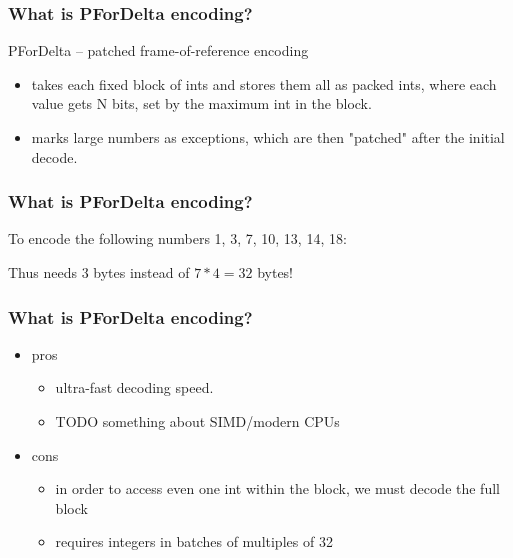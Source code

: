 \documentclass{beamer}
\begin{document}
  	\begin{frame}
  		\frametitle{What is PForDelta encoding?}
  		PForDelta -- patched frame-of-reference encoding
  		\begin{itemize}
  			\item takes each fixed block of ints and stores them all as packed ints, where each value gets N bits, set by the maximum int in the block.
  			\item marks large numbers as exceptions, which are then "patched" after the initial decode.	
  		\end{itemize}
  	\end{frame}
  	\begin{frame}
  		\frametitle{What is PForDelta encoding?}
  		To encode the following numbers 1, 3, 7, 10, 13, 14, 18:
		\vskip15pt 
		\vskip15pt 	
		\pause
		Thus needs 3 bytes instead of $7*4=32$ bytes!
  	\end{frame}
  	\begin{frame}
  		\frametitle{What is PForDelta encoding?}
  		\begin{itemize}
    		    \item pros
    		    \begin{itemize}
    		    		\item \mbox{ultra-fast} decoding speed.%
    		    		\item {\color{red!100} TODO something about SIMD/modern CPUs}
    		    \end{itemize}
    		    \item cons
    		    \begin{itemize}
    		    		\item in order to access even one int within the block, we must decode the full block
    		    		\item requires integers in batches of multiples of 32
    		    \end{itemize}
		\end{itemize}  		
  	\end{frame}
\end{document}
